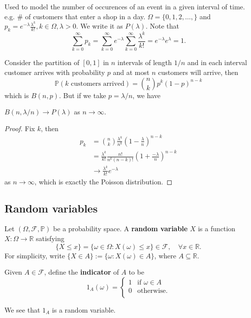 \begin{example}
    Used to model the number of occurences of an event in a given interval of time. e.g. \# of customers that enter a shop in a day. $ \Omega=\{0,1,2,\dots,\} $ and $ p_k = e^{-\lambda}\frac{\lambda^k}{k!}, k\in \Omega, \lambda>0 $. We write it as $ P(\lambda) $. Note that 
    \[
        \sum_{k=0}^{\infty}p_k=\sum_{k=0}^{\infty} e^{-\lambda}\sum_{k=0}^{\infty}\frac{\lambda^k}{k!}=e^{-\lambda}e^\lambda=1.
    \]
\end{example}

Consider the partition of $[0,1]$ in $n$ intervals of length $1/n$ and in each interval customer arrives with probability $p$ and at most $n$ customers will arrive, then
$$\mathbb P(\text{$k$ customers arrived})=\binom{n}{k}p^k(1-p)^{n-k}$$
which is $B(n,p)$.
But if we take $p=\lambda/n$, we have
\begin{proposition}
    $B(n,\lambda/n)\to P(\lambda)$ as $n\to\infty$.
\end{proposition}
\begin{proof}
    Fix $k$, then
    \begin{align*}
        p_k&=\binom{n}{k}\frac{\lambda^k}{n^k}\left(1-\frac{\lambda}{n}\right)^{n-k}\\
        &=\frac{\lambda^k}{k!}\frac{n!}{n^k(n-k)!}(1+\frac{-\lambda}{n})^{n-k}\\
        &\to\frac{\lambda^k}{k!}e^{-\lambda}
    \end{align*}
    as $n\to\infty$, which is exactly the Poisson distribution.
\end{proof}

\subsection{Random variables}
\begin{definition}
    Let $ (\Omega,\mathscr{F},\mathbb{P}) $ be a probability space. A \textbf{random variable} $X$ is a function $ X: \Omega\to \mathbb{R} $ satisfying 
    \[
        \{X\le x\}=\{\omega\in \Omega: X(\omega)\le x\}\in \mathscr{F},\quad \forall x\in \mathbb{R}.
    \]
    For simplicity, write $ \{X\in A\}:= \{\omega:X(\omega)\in A\} $, where $A \subseteq \mathbb{R}$.
\end{definition}

\begin{definition}
    Given $ A\in \mathscr{F} $, define the \textbf{indicator} of $A$ to be 
    \[
        1_A (\omega) = \begin{cases}
        1 &\text{if } \omega\in A\\
        0 &\text{otherwise.}\\
        \end{cases} 
    \]
\end{definition}
We see that $1_A$ is a random variable.

